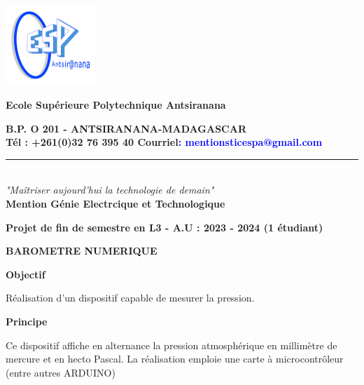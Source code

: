 \documentclass[a4paper,12pt]{report}
\begin{document}
\begin{center}
	\begin{minipage}{2.5cm}
	\begin{center}
	\hspace{-3cm}
		\includegraphics[height=3cm]{ESP.png}	
	\end{center}
\end{minipage}\hfill
\begin{minipage}{13cm}
	\begin{center}
    \textbf{Ecole Supérieure Polytechnique Antsiranana}
    \center
    
    \textbf{B.P. O 201 - ANTSIRANANA-MADAGASCAR}\\[2mm]
    \hspace{-1cm}
    \textbf{Tél : +261(0)32 76 395 40 Courriel\textcolor{blue}{: mentionsticespa@gmail.com}}
 	\noindent\rule{\linewidth}{0.5pt}
     
	\end{center}
\end{minipage}\hfill \\[5mm]


\center
\textit{"Maîtriser aujourd'hui la technologie de demain"}\\ [0.5cm]
\center
\textbf{Mention Génie Electrcique et Technologique}\\[5mm]
\center


\center
\textbf{Projet de fin de semestre en L3 - A.U : 2023 - 2024 (1 étudiant)}\\[0.8cm]
\center 

\center
\textbf{BAROMETRE NUMERIQUE}\\[5mm]
\center

\hspace{-15cm}
\textbf{Objectif} \\[1mm]
\begin{flushleft}
Réalisation d’un dispositif capable de mesurer la pression. \\ [3mm]
\end{flushleft}

\hspace{-15cm}
\textbf{Principe} \\[5mm]
\begin{flushleft}
Ce dispositif affiche en alternance la pression atmosphérique en
millimètre de mercure et en hecto Pascal.
La réalisation emploie une carte à microcontrôleur (entre autres ARDUINO) \\ [3mm]
\end{flushleft}


\end{center}
\end{document}
